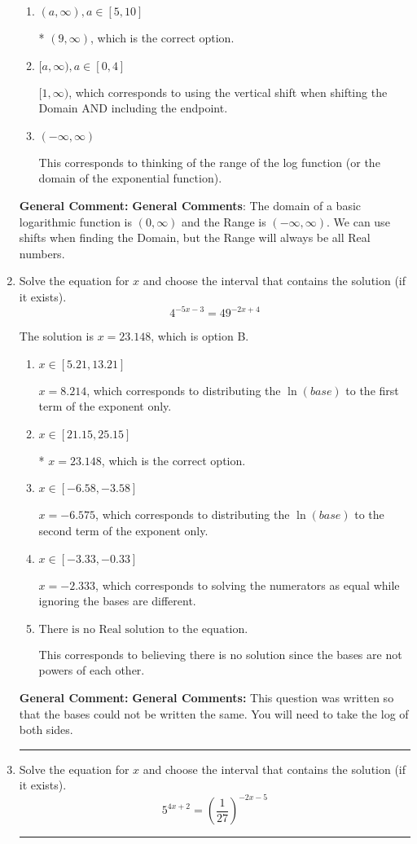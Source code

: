 \documentclass{extbook}[14pt]
\newcommand{\litem}[1]{\item #1

\rule{\textwidth}{0.4pt}}
\begin{document}
\begin{enumerate}
{\begin{enumerate}[label=\Alph*.]
$(-\infty, -1]$, which corresponds to using the negative vertical shift AND including the endpoint AND flipping the domain.
\item \( (a, \infty), a \in [5, 10] \)

* $(9, \infty)$, which is the correct option.
\item \( [a, \infty), a \in [0, 4] \)

$[1, \infty)$, which corresponds to using the vertical shift when shifting the Domain AND including the endpoint.
\item \( (-\infty, \infty) \)

This corresponds to thinking of the range of the log function (or the domain of the exponential function).
\end{enumerate}

\textbf{General Comment:} \textbf{General Comments}: The domain of a basic logarithmic function is $(0, \infty)$ and the Range is $(-\infty, \infty)$. We can use shifts when finding the Domain, but the Range will always be all Real numbers.
}
\litem{
Solve the equation for $x$ and choose the interval that contains the solution (if it exists).
\[ 4^{-5x-3} = 49^{-2x+4} \]

The solution is \( x = 23.148 \), which is option B.\begin{enumerate}[label=\Alph*.]
\item \( x \in [5.21, 13.21] \)

$x = 8.214$, which corresponds to distributing the $\ln(base)$ to the first term of the exponent only.
\item \( x \in [21.15, 25.15] \)

* $x = 23.148$, which is the correct option.
\item \( x \in [-6.58, -3.58] \)

$x = -6.575$, which corresponds to distributing the $\ln(base)$ to the second term of the exponent only.
\item \( x \in [-3.33, -0.33] \)

$x = -2.333$, which corresponds to solving the numerators as equal while ignoring the bases are different.
\item \( \text{There is no Real solution to the equation.} \)

This corresponds to believing there is no solution since the bases are not powers of each other.
\end{enumerate}

\textbf{General Comment:} \textbf{General Comments:} This question was written so that the bases could not be written the same. You will need to take the log of both sides.
}
\litem{
Solve the equation for $x$ and choose the interval that contains the solution (if it exists).
\[ 5^{4x+2} = \left(\frac{1}{27}\right)^{-2x-5} \]

}
\end{enumerate}
\end{document}

